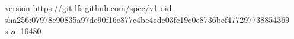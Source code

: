 version https://git-lfs.github.com/spec/v1
oid sha256:07978c90835a97de90f16e877c4be4ede03fc19c0e8736bef477297738854369
size 16480
